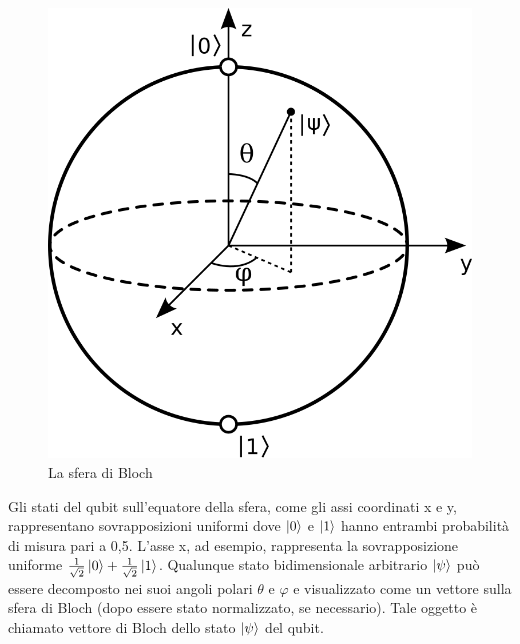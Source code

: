 \begin{figure}[ht]
    \centering
    \includegraphics[width=.8\linewidth]{gfx/Bloch_sphere}
    \caption{La sfera di Bloch}
    \label{fig:bloch}
\end{figure}

Gli stati del qubit sull'equatore della sfera, come gli assi coordinati x e y, rappresentano 
sovrapposizioni uniformi dove $\ket{0}$ e $\ket{1}$ hanno entrambi probabilità di misura pari a 
0,5. L'asse x, ad esempio, rappresenta la sovrapposizione uniforme $\frac{1}{\sqrt{2}}
\ket{0} + \frac{1}{\sqrt{2}}\ket{1}$. 
Qualunque stato bidimensionale arbitrario $\ket{\psi}$ può essere decomposto nei suoi angoli 
polari $\theta$ e $\varphi$ e visualizzato come un vettore sulla sfera di Bloch (dopo essere 
stato normalizzato, se necessario). Tale oggetto è chiamato vettore di Bloch dello stato 
$\ket{\psi}$ del qubit. 

